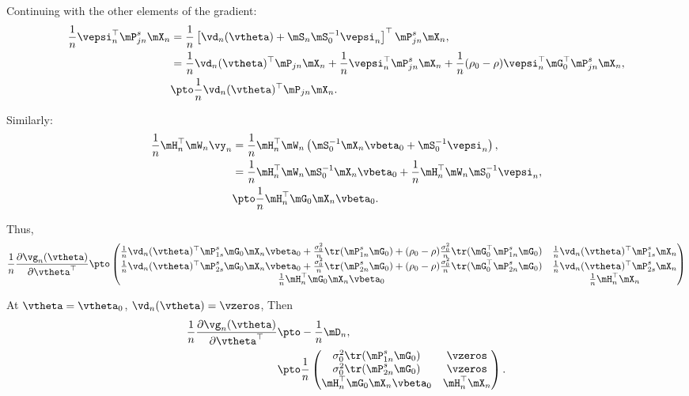 \documentclass[english,12pt]{book}\usepackage[]{graphicx}\usepackage[]{xcolor}
\begin{document}
Continuing with the other elements of the gradient:
\begin{equation*}
  \begin{aligned}
    \frac{1}{n}\vepsi_n^\top\mP_{jn}^s\mX_n & = \frac{1}{n}\left[\vd_n(\vtheta)+ \mS_n\mS_0^{-1}\vepsi_n\right]^\top\mP_{jn}^s\mX_n, \\
    & = \frac{1}{n}\vd_n(\vtheta)^\top\mP_{jn}\mX_n  + \frac{1}{n}\vepsi_n^\top\mP_{jn}^s\mX_n + \frac{1}{n}(\rho_0 - \rho)\vepsi_n^\top\mG_0^\top\mP^s_{jn}\mX_n, \\
    & \pto  \frac{1}{n}\vd_n(\vtheta)^\top\mP_{jn}\mX_n.
  \end{aligned}
\end{equation*}

Similarly:
\begin{equation*}
  \begin{aligned}
    \frac{1}{n}\mH_n^\top\mW_n\vy_n &  = \frac{1}{n}\mH_n^\top\mW_n\left(\mS_0^{-1}\mX_n\vbeta_0 + \mS_0^{-1}\vepsi_n\right), \\
    & = \frac{1}{n}\mH_n^\top\mW_n\mS_0^{-1}\mX_n\vbeta_0 +  \frac{1}{n}\mH_n^\top\mW_n\mS_0^{-1}\vepsi_n, \\
    & \pto \frac{1}{n}\mH_n^\top\mG_0\mX_n\vbeta_0.
  \end{aligned}
\end{equation*}

Thus, 
\begin{equation*}
  \frac{1}{n}\frac{\partial \vg_n(\vtheta)}{\partial \vtheta^\top} \pto 
  \begin{pmatrix}
    \frac{1}{n}\vd_n(\vtheta)^\top\mP_{1s}^s\mG_0\mX_n\vbeta_0 + \frac{\sigma_0^2}{n}\tr(\mP_{1n}^s\mG_0) + (\rho_0 - \rho)\frac{\sigma_0^2}{n}\tr(\mG_0^\top\mP_{1n}^s\mG_0) & \frac{1}{n}\vd_n(\vtheta)^\top\mP_{1s}^s\mX_n \\
        \frac{1}{n}\vd_n(\vtheta)^\top\mP_{2s}^s\mG_0\mX_n\vbeta_0 + \frac{\sigma_0^2}{n}\tr(\mP_{2n}^s\mG_0) + (\rho_0 - \rho)\frac{\sigma_0^2}{n}\tr(\mG_0^\top\mP_{2n}^s\mG_0) & \frac{1}{n}\vd_n(\vtheta)^\top\mP_{2s}^s\mX_n \\
      \frac{1}{n}\mH_n^\top\mG_0\mX_n\vbeta_0 & \frac{1}{n}\mH_n^\top\mX_n  
  \end{pmatrix}
\end{equation*}

At $\vtheta = \vtheta_0$, $\vd_n(\vtheta) = \vzeros$, Then
\begin{equation*}
\begin{aligned}
  \frac{1}{n}\frac{\partial \vg_n(\vtheta)}{\partial \vtheta^\top} & \pto  -\frac{1}{n}\mD_n, \\
  &\pto \frac{1}{n}\begin{pmatrix}
  \sigma_0^2\tr(\mP_{1n}^s\mG_0) & \vzeros \\
   \sigma_0^2\tr(\mP_{2n}^s\mG_0)  & \vzeros \\
      \mH_n^\top\mG_0\mX_n\vbeta_0 & \mH_n^\top\mX_n  
  \end{pmatrix}.
        \end{aligned}
\end{equation*}
  
\end{document}
